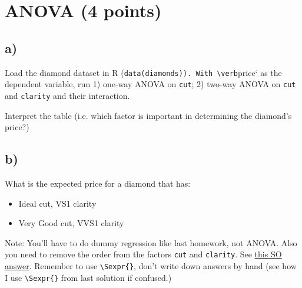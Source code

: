 \documentclass{article}\usepackage[]{graphicx}\usepackage[]{color}
\begin{document}
\section{ANOVA (4 points)}

\subsection*{a)}

Load the diamond dataset in R (\verb`data(diamonds)). With \verb`price` as the dependent variable, run 1) one-way ANOVA on \verb`cut`; 2) two-way ANOVA on \verb`cut` and \verb`clarity` and their interaction.

Interpret the table (i.e. which factor is important in determining the diamond's price?)

\subsection*{b)}

What is the expected price for a diamond that has:
\begin{itemize}
\item Ideal cut, VS1 clarity
\item Very Good cut, VVS1 clarity
\end{itemize}

Note: You'll have to do dummy regression like last homework, not ANOVA. Also you need to remove the order from the factors \verb`cut` and \verb`clarity`. See \href{http://stackoverflow.com/questions/17592524/how-to-remove-ordering-of-the-levels-from-factor-variable-in-r}{this SO answer}. Remember to use \verb`\Sexpr{}`, don't write down answers by hand (see how I use \verb`\Sexpr{}` from last solution if confused.)
\end{document}
